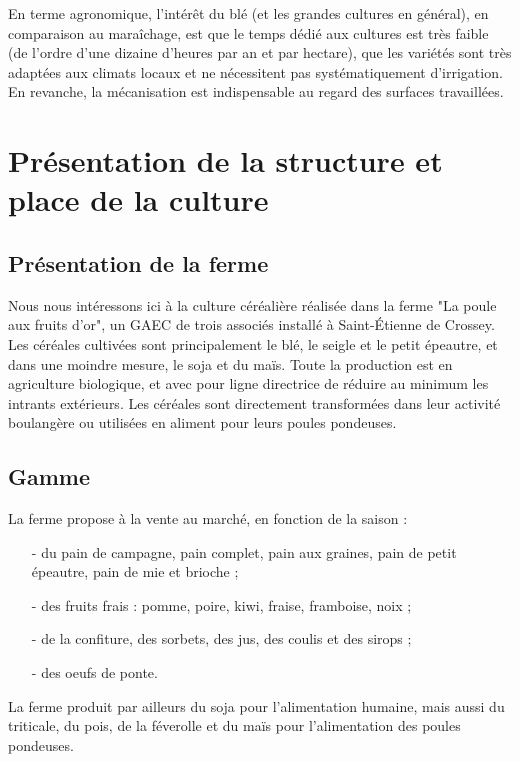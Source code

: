\documentclass{article}
\begin{document}
En terme agronomique, l'intérêt du blé (et les grandes cultures en général), en comparaison au maraîchage, est que le temps dédié aux cultures est très faible (de l'ordre d'une dizaine d'heures par an et par hectare), que les variétés sont très adaptées aux climats locaux et ne nécessitent pas systématiquement d'irrigation. En revanche, la mécanisation est indispensable au regard des surfaces travaillées. 

\section{Présentation de la structure et place de la culture}

\subsection{Présentation de la ferme}

Nous nous intéressons ici à la culture céréalière réalisée dans la ferme "La poule aux fruits d'or", un GAEC de trois associés installé à Saint-Étienne de Crossey. Les céréales cultivées sont principalement le blé, le seigle et le petit épeautre, et dans une moindre mesure, le soja et du maïs. Toute la production est en agriculture biologique, et avec pour ligne directrice de réduire au minimum les intrants extérieurs. Les céréales sont directement transformées dans leur activité boulangère ou utilisées en aliment pour leurs poules pondeuses.

\subsection{Gamme}

La ferme propose à la vente au marché, en fonction de la saison :
\begin{itemize}
	\item[-] du pain de campagne, pain complet, pain aux graines, pain de petit épeautre, pain de mie et brioche ;
	\item[-] des fruits frais : pomme, poire, kiwi, fraise, framboise, noix ;
	\item[-] de la confiture, des sorbets, des jus, des coulis et des sirops ;
	\item[-] des oeufs de ponte.
\end{itemize}

La ferme produit par ailleurs du soja pour l'alimentation humaine, mais aussi du triticale, du pois, de la féverolle et du maïs pour l'alimentation des poules pondeuses.
\end{document}
